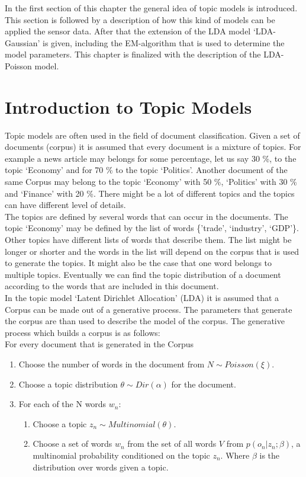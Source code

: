 

In the first section of this chapter the general idea of topic models is introduced. This section is followed by a description of how this kind of models can be applied the sensor data. After that the extension of the LDA model `LDA-Gaussian' is given, including the EM-algorithm that is used to determine the model parameters. This chapter is finalized with the description of the LDA-Poisson model.

\section{Introduction to Topic Models}
Topic models are often used in the field of document classification. Given a set of documents (corpus) it is assumed that every document is a mixture of topics. For example a news article may belongs for some percentage, let us say 30 \%,  to the topic `Economy' and for 70 \%  to the topic `Politics'. Another document of the same Corpus may belong to the topic `Economy' with 50 \%, `Politics' with 30 \% and `Finance' with 20 \%. There might be a lot of different topics and the topics can have different level of details. \\
The topics are defined by several words that can occur in the documents. The topic `Economy' may be defined by the list of words \{'trade', `industry', `GDP'\}. Other topics have different lists of words that describe them. The list might be longer or shorter and the words in the list will depend on the corpus that is used to generate the topics. It might also be the case that one word belongs to multiple topics. Eventually we can find the topic distribution of a document according to the words that are included in this document.\\
In the topic model `Latent Dirichlet Allocation' (LDA) it is assumed that a Corpus can be made out of a generative process. The parameters that generate the corpus are than used to describe the model of the corpus. The generative process which builds a corpus is as follows:\\
For every document that is generated in the Corpus
\begin{enumerate}
 \item Choose the number of words in the document from $N \sim Poisson(\xi)$.
 \item Choose a topic distribution $\theta \sim Dir(\alpha)$ for the document.
 \item For each of the N words $w_n$:
 
 \begin{enumerate}
  \item Choose a topic $z_n \sim Multinomial(\theta)$.
  \item Choose a set of words $w_n$ from the set of all words $V$ from $p(o_n |z_n;\beta)$, a multinomial probability conditioned on the topic $z_n$. Where $\beta$ is the distribution over words given a topic.
 \end{enumerate}

\end{enumerate}

